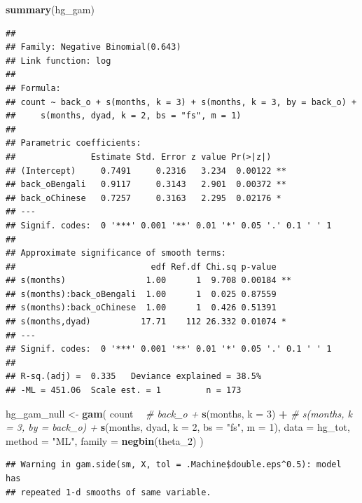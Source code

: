 \documentclass[]{article}
\newenvironment{Shaded}{\begin{snugshade}}{\end{snugshade}}
\newcommand{\CommentTok}[1]{\textcolor[rgb]{0.56,0.35,0.01}{\textit{#1}}}
\newcommand{\DataTypeTok}[1]{\textcolor[rgb]{0.13,0.29,0.53}{#1}}
\newcommand{\DecValTok}[1]{\textcolor[rgb]{0.00,0.00,0.81}{#1}}
\newcommand{\KeywordTok}[1]{\textcolor[rgb]{0.13,0.29,0.53}{\textbf{#1}}}
\newcommand{\NormalTok}[1]{#1}
\newcommand{\OperatorTok}[1]{\textcolor[rgb]{0.81,0.36,0.00}{\textbf{#1}}}
\newcommand{\StringTok}[1]{\textcolor[rgb]{0.31,0.60,0.02}{#1}}
\begin{document}
\begin{Shaded}
\begin{Highlighting}[]
\KeywordTok{summary}\NormalTok{(hg_gam)}
\end{Highlighting}
\end{Shaded}

\begin{verbatim}
## 
## Family: Negative Binomial(0.643) 
## Link function: log 
## 
## Formula:
## count ~ back_o + s(months, k = 3) + s(months, k = 3, by = back_o) + 
##     s(months, dyad, k = 2, bs = "fs", m = 1)
## 
## Parametric coefficients:
##               Estimate Std. Error z value Pr(>|z|)   
## (Intercept)     0.7491     0.2316   3.234  0.00122 **
## back_oBengali   0.9117     0.3143   2.901  0.00372 **
## back_oChinese   0.7257     0.3163   2.295  0.02176 * 
## ---
## Signif. codes:  0 '***' 0.001 '**' 0.01 '*' 0.05 '.' 0.1 ' ' 1
## 
## Approximate significance of smooth terms:
##                           edf Ref.df Chi.sq p-value   
## s(months)                1.00      1  9.708 0.00184 **
## s(months):back_oBengali  1.00      1  0.025 0.87559   
## s(months):back_oChinese  1.00      1  0.426 0.51391   
## s(months,dyad)          17.71    112 26.332 0.01074 * 
## ---
## Signif. codes:  0 '***' 0.001 '**' 0.01 '*' 0.05 '.' 0.1 ' ' 1
## 
## R-sq.(adj) =  0.335   Deviance explained = 38.5%
## -ML = 451.06  Scale est. = 1         n = 173
\end{verbatim}

\begin{Shaded}
\begin{Highlighting}[]
\NormalTok{hg_gam_null <-}\StringTok{ }\KeywordTok{gam}\NormalTok{(}
\NormalTok{  count }\OperatorTok{~}
\StringTok{    }\CommentTok{# back_o +}
\StringTok{    }\KeywordTok{s}\NormalTok{(months, }\DataTypeTok{k =} \DecValTok{3}\NormalTok{) }\OperatorTok{+}
\StringTok{    }\CommentTok{# s(months, k = 3, by = back_o) +}
\StringTok{    }\KeywordTok{s}\NormalTok{(months, dyad, }\DataTypeTok{k =} \DecValTok{2}\NormalTok{, }\DataTypeTok{bs =} \StringTok{"fs"}\NormalTok{, }\DataTypeTok{m =} \DecValTok{1}\NormalTok{),}
  \DataTypeTok{data =}\NormalTok{ hg_tot,}
  \DataTypeTok{method =} \StringTok{"ML"}\NormalTok{,}
  \DataTypeTok{family =} \KeywordTok{negbin}\NormalTok{(theta_}\DecValTok{2}\NormalTok{)}
\NormalTok{)}
\end{Highlighting}
\end{Shaded}

\begin{verbatim}
## Warning in gam.side(sm, X, tol = .Machine$double.eps^0.5): model has
## repeated 1-d smooths of same variable.
\end{verbatim}
\end{document}
